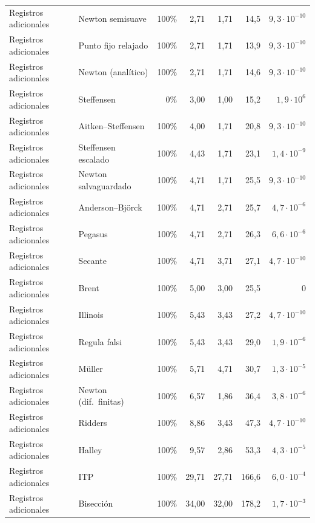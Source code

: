 \begin{longtable}{@{}llrrrrr@{}}
\midrule
Registros adicionales & Newton semisuave & 100\% & 2{,}71 & 1{,}71 & 14{,}5 & $9{,}3\cdot10^{-10}$ \\
Registros adicionales & Punto fijo relajado & 100\% & 2{,}71 & 1{,}71 & 13{,}9 & $9{,}3\cdot10^{-10}$ \\
Registros adicionales & Newton (analítico) & 100\% & 2{,}71 & 1{,}71 & 14{,}6 & $9{,}3\cdot10^{-10}$ \\
Registros adicionales & Steffensen & 0\% & 3{,}00 & 1{,}00 & 15{,}2 & $1{,}9\cdot10^{6}$ \\
Registros adicionales & Aitken--Steffensen & 100\% & 4{,}00 & 1{,}71 & 20{,}8 & $9{,}3\cdot10^{-10}$ \\
Registros adicionales & Steffensen escalado & 100\% & 4{,}43 & 1{,}71 & 23{,}1 & $1{,}4\cdot10^{-9}$ \\
Registros adicionales & Newton salvaguardado & 100\% & 4{,}71 & 1{,}71 & 25{,}5 & $9{,}3\cdot10^{-10}$ \\
Registros adicionales & Anderson--Björck & 100\% & 4{,}71 & 2{,}71 & 25{,}7 & $4{,}7\cdot10^{-6}$ \\
Registros adicionales & Pegasus & 100\% & 4{,}71 & 2{,}71 & 26{,}3 & $6{,}6\cdot10^{-6}$ \\
Registros adicionales & Secante & 100\% & 4{,}71 & 3{,}71 & 27{,}1 & $4{,}7\cdot10^{-10}$ \\
Registros adicionales & Brent & 100\% & 5{,}00 & 3{,}00 & 25{,}5 & $0$ \\
Registros adicionales & Illinois & 100\% & 5{,}43 & 3{,}43 & 27{,}2 & $4{,}7\cdot10^{-10}$ \\
Registros adicionales & Regula falsi & 100\% & 5{,}43 & 3{,}43 & 29{,}0 & $1{,}9\cdot10^{-6}$ \\
Registros adicionales & Müller & 100\% & 5{,}71 & 4{,}71 & 30{,}7 & $1{,}3\cdot10^{-5}$ \\
Registros adicionales & Newton (dif.\ finitas) & 100\% & 6{,}57 & 1{,}86 & 36{,}4 & $3{,}8\cdot10^{-6}$ \\
Registros adicionales & Ridders & 100\% & 8{,}86 & 3{,}43 & 47{,}3 & $4{,}7\cdot10^{-10}$ \\
Registros adicionales & Halley & 100\% & 9{,}57 & 2{,}86 & 53{,}3 & $4{,}3\cdot10^{-5}$ \\
Registros adicionales & ITP & 100\% & 29{,}71 & 27{,}71 & 166{,}6 & $6{,}0\cdot10^{-4}$ \\
Registros adicionales & Bisección & 100\% & 34{,}00 & 32{,}00 & 178{,}2 & $1{,}7\cdot10^{-3}$ \\

\end{longtable}
